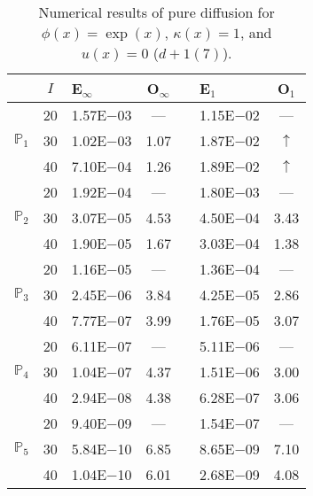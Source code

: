 \begin{table}[H]
\centering
\caption{Numerical results of pure diffusion for $\phi(x)=\exp(x)$, $\kappa(x)=1$, and $u(x)=0$ ($d+1(7)$).}
\begin{tabular}{@{}l c l c c l c@{}}
\toprule
 & $I$ & E$_{\infty}$ & O$_{\infty}$ && E$_1$ & O$_1$\\
\midrule
\multirow{3}{*}{$\mathbb{P}_{1}$}
 & 20 & 1.57E$-$03 & --- && 1.15E$-$02 & ---\\
 & 30 & 1.02E$-$03 & 1.07 && 1.87E$-$02 & $\uparrow$\\
 & 40 & 7.10E$-$04 & 1.26 && 1.89E$-$02 & $\uparrow$\\
\midrule
\multirow{3}{*}{$\mathbb{P}_{2}$}
 & 20 & 1.92E$-$04 & --- && 1.80E$-$03 & ---\\
 & 30 & 3.07E$-$05 & 4.53 && 4.50E$-$04 & 3.43\\
 & 40 & 1.90E$-$05 & 1.67 && 3.03E$-$04 & 1.38\\
\midrule
\multirow{3}{*}{$\mathbb{P}_{3}$}
 & 20 & 1.16E$-$05 & --- && 1.36E$-$04 & ---\\
 & 30 & 2.45E$-$06 & 3.84 && 4.25E$-$05 & 2.86\\
 & 40 & 7.77E$-$07 & 3.99 && 1.76E$-$05 & 3.07\\
\midrule
\multirow{3}{*}{$\mathbb{P}_{4}$}
 & 20 & 6.11E$-$07 & --- && 5.11E$-$06 & ---\\
 & 30 & 1.04E$-$07 & 4.37 && 1.51E$-$06 & 3.00\\
 & 40 & 2.94E$-$08 & 4.38 && 6.28E$-$07 & 3.06\\
\midrule
\multirow{3}{*}{$\mathbb{P}_{5}$}
 & 20 & 9.40E$-$09 & --- && 1.54E$-$07 & ---\\
 & 30 & 5.84E$-$10 & 6.85 && 8.65E$-$09 & 7.10\\
 & 40 & 1.04E$-$10 & 6.01 && 2.68E$-$09 & 4.08\\
\bottomrule
\end{tabular}
\end{table}